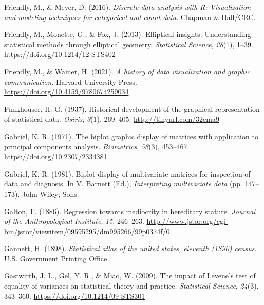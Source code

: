 \documentclass[
  letterpaper,
  10pt,
  krantz2]{krantz}
\newlength{\cslhangindent}
\newlength{\cslentryspacingunit} %
\newenvironment{CSLReferences}[2] %
 {%
  \setlength{\parindent}{0pt}
  \ifodd #1
  \let\oldpar\par
  \def\par{\hangindent=\cslhangindent\oldpar}
  \fi
  \setlength{\parskip}{#2\cslentryspacingunit}
 }%
 {}
\begin{document}
\begin{CSLReferences}{1}{0}
\leavevmode{}%
Friendly, M., \& Meyer, D. (2016). \emph{Discrete data analysis with
{R}: Visualization and modeling techniques for categorical and count
data}. Chapman \& Hall/CRC.

\leavevmode{}%
Friendly, M., Monette, G., \& Fox, J. (2013). Elliptical insights:
Understanding statistical methods through elliptical geometry.
\emph{Statistical Science}, \emph{28}(1), 1--39.
\url{https://doi.org/10.1214/12-STS402}

\leavevmode{}%
Friendly, M., \& Wainer, H. (2021). \emph{A history of data
visualization and graphic communication}. Harvard University Press.
\url{https://doi.org/10.4159/9780674259034}

\leavevmode{}%
Funkhouser, H. G. (1937). Historical development of the graphical
representation of statistical data. \emph{Osiris}, \emph{3}(1),
269--405. \url{http://tinyurl.com/32ema9}

\leavevmode{}%
Gabriel, K. R. (1971). The biplot graphic display of matrices with
application to principal components analysis. \emph{Biometrics},
\emph{58}(3), 453--467. \url{https://doi.org/10.2307/2334381}

\leavevmode{}%
Gabriel, K. R. (1981). Biplot display of multivariate matrices for
inspection of data and diagnosis. In V. Barnett (Ed.),
\emph{Interpreting multivariate data} (pp. 147--173). John Wiley; Sons.

\leavevmode{}%
Galton, F. (1886). Regression towards mediocrity in hereditary stature.
\emph{Journal of the Anthropological Institute}, \emph{15}, 246--263.
\url{http://www.jstor.org/cgi-bin/jstor/viewitem/09595295/dm995266/99p0374f/0}

\leavevmode{}%
Gannett, H. (1898). \emph{Statistical atlas of the united states,
eleventh (1890) census}. U.S. Government Printing Office.

\leavevmode{}%
Gastwirth, J. L., Gel, Y. R., \& Miao, W. (2009). The impact of
{Levene's} test of equality of variances on statistical theory and
practice. \emph{Statistical Science}, \emph{24}(3), 343--360.
\url{https://doi.org/10.1214/09-STS301}


\end{CSLReferences}
\end{document}
